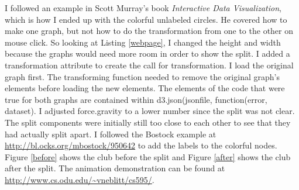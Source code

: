 \documentclass{article}
\begin{document}
I followed an example in Scott Murray's book \emph {Interactive Data Visualization}, which is how I ended up with the colorful unlabeled circles. He covered how to make one graph, but not how to do the transformation from one to the other on mouse click. So looking at Listing \ref{webpage}, I changed the height and width because the graphs would need more room in order to show the split. I added a transformation attribute to create the call for transformation. I load the original graph first. The transforming function needed to remove the original graph's elements before loading the new elements. The elements of the code that were true for both graphs are contained within d3.json(jsonfile, function(error, dataset). I adjusted force.gravity to a lower number since the split was not clear. The split components were initially still too close to each other to see that they had actually split apart. I followed the Bostock example at \url{http://bl.ocks.org/mbostock/950642} to add the labels to the colorful nodes. Figure \ref{before} shows the club before the split and Figure \ref{after} shows the club after the split. The animation demonstration can be found at \url{http://www.cs.odu.edu/~vneblitt/cs595/}.
\end{document}
